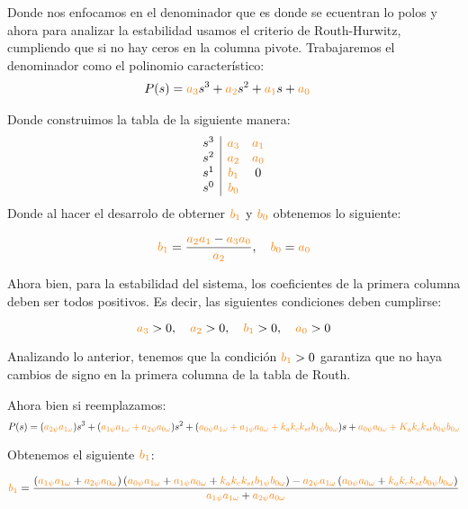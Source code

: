 Donde nos enfocamos en el denominador que es donde se ecuentran lo polos y ahora para analizar la estabilidad usamos el criterio de Routh-Hurwitz, cumpliendo que si no hay ceros en la columna pivote. Trabajaremos el denominador como el polinomio característico:
\begin{align}
    P(s) = \nara{a_3} s^3 + \nara{a_2} s^2 + \nara{a_1} s + \nara{a_0} &
\end{align}

Donde construimos la tabla de la siguiente manera:
\[
\begin{array}{c|cc}
s^3 & \nara{a_3} & \nara{a_1} \\
s^2 & \nara{a_2} & \nara{a_0} \\
s^1 & \nara{b_1} & 0 \\
s^0 & \nara{b_0} & 
\end{array}
\]
Donde al hacer el desarrolo de obterner \(\nara{b_1}\) y \(\nara{b_0}\) obtenemos lo siguiente:

\[
\nara{b_1} = \frac{\nara{a_2 a_1} - \nara{a_3 a_0}}{\nara{a_2}}, \quad \nara{b_0} = \nara{a_0}
\]

Ahora bien, para la estabilidad del sistema, los coeficientes de la primera columna deben ser todos positivos. Es decir, las siguientes condiciones deben cumplirse:

\[
\nara{a_3} > 0, \quad \nara{a_2} > 0, \quad \nara{b_1} > 0, \quad \nara{a_0} > 0
\]

Analizando lo anterior, tenemos que la condición \( \nara{b_1} > 0 \) garantiza que no haya cambios de signo en la primera columna de la tabla de Routh.

Ahora bien si reemplazamos:
 \[
 P(s)=(\nara{a_{2\psi} a_{1\omega}})s^3 + (\nara{a_{1\psi} a_{1\omega} + a_{2\psi} a_{0\omega}})s^2 + (\nara{a_{0\psi} a_{1\omega} + a_{1\psi} a_{0\omega} + k_a k_c k_{st} b_{1\psi} b_{0\omega}})s + \nara{a_{0\psi} a_{0\omega} + K_a k_c k_{st} b_{0\psi} b_{0\omega}}
 \] 

Obtenemos el siguiente $\nara{b_1}$:
 

\begin{equation}
    \nara{b_1}=\frac{
        \left(\nara{a_{1\psi} a_{1\omega}} + \nara{a_{2\psi} a_{0\omega}}\right)
        \left(\nara{a_{0\psi} a_{1\omega}} + \nara{a_{1\psi} a_{0\omega}} + \nara{k_a k_c k_{st} b_{1\psi} b_{0\omega}}\right) 
        - \nara{a_{2\psi} a_{1\omega}} 
        \left(\nara{a_{0\psi} a_{0\omega}} + \nara{k_a k_c k_{st} b_{0\psi} b_{0\omega}}\right)
    }{
        \nara{a_{1\psi} a_{1\omega}} + \nara{a_{2\psi} a_{0\omega}}
    }
\end{equation}

